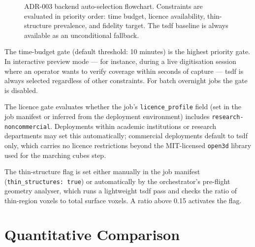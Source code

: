 \begin{figure}[htbp]
  \caption{ADR-003 backend auto-selection flowchart. Constraints are evaluated in priority order: time budget, licence availability, thin-structure prevalence, and fidelity target. The \acrshort{tsdf} baseline is always available as an unconditional fallback.}
  \label{fig:adr003-flow}
\end{figure}

The time-budget gate (default threshold: 10 minutes) is the highest priority gate. In interactive preview mode --- for instance, during a live digitisation session where an operator wants to verify coverage within seconds of capture --- \acrshort{tsdf} is always selected regardless of other constraints. For batch overnight jobs the gate is disabled.

The licence gate evaluates whether the job's \texttt{licence\_profile} field (set in the job manifest or inferred from the deployment environment) includes \texttt{research-noncommercial}. Deployments within academic institutions or research departments may set this automatically; commercial deployments default to \acrshort{tsdf} only, which carries no licence restrictions beyond the MIT-licensed \texttt{open3d} library used for the marching cubes step.

The thin-structure flag is set either manually in the job manifest (\texttt{thin\_structures: true}) or automatically by the orchestrator's pre-flight geometry analyser, which runs a lightweight \acrshort{tsdf} pass and checks the ratio of thin-region voxels to total surface voxels. A ratio above 0.15 activates the flag.

\section{Quantitative Comparison}
\label{sec:meshing-quantitative}

